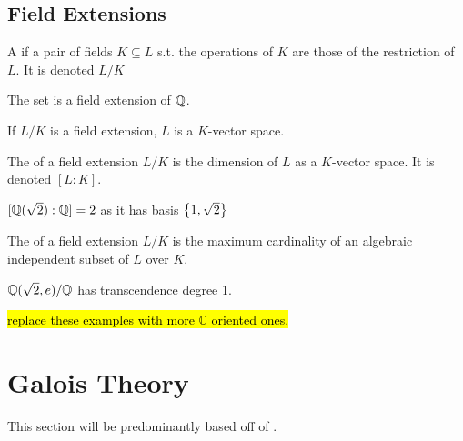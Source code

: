 \documentclass{article}
\begin{document}
\subsection{Field Extensions}
\begin{definition}
	A  if a pair of fields $K \subseteq L$ s.t. the operations of $K$ are those of the restriction of $L$. It is denoted $L / K$
\end{definition}

\begin{example}
	The set 
	is a field extension of $\mathbb{Q}$. 
\end{example}

\begin{prop}
	If $L/K$ is a field extension, $L$ is a $K$-vector space. 
\end{prop}

\begin{definition}
	The  of a field extension $L/K$ is the dimension of $L$ as a $K$-vector space. It is denoted $[L:K]$.
\end{definition}

\begin{example}
	$[\mathbb{Q}(\sqrt{2}):\mathbb{Q}] = 2$ as it has basis $\left\{ 1,\sqrt{2} \right\}$
\end{example}

\begin{definition}
	The  of a field extension $L/K$ is the maximum cardinality of an algebraic independent subset of $L$ over $K$. 
\end{definition}

\begin{example}
	$\mathbb{Q}(\sqrt{2},e)/\mathbb{Q}$ has transcendence degree 1.
\end{example}

\hl{replace these examples with more $\mathbb{C}$ oriented ones. }
\section{Galois Theory}
This section will be predominantly based off of \cite{Stewart2003}. 
\end{document}
